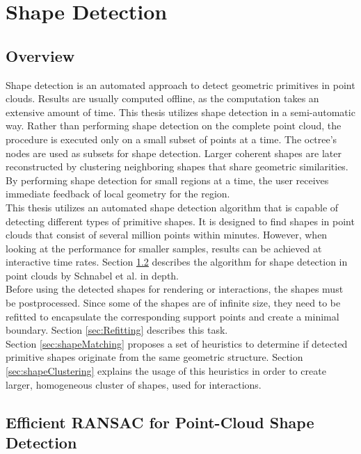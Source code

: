 \chapter{Shape Detection}
\label{chap:shapeDetection}


\section{Overview}

Shape detection is an automated approach to detect geometric primitives in point clouds. Results are usually computed offline, as the computation takes an extensive amount of time. This thesis utilizes shape detection in a semi-automatic way. Rather than performing shape detection on the complete point cloud, the procedure is executed only on a small subset of points at a time. The octree's nodes are used as subsets for shape detection. Larger coherent shapes are later reconstructed by clustering neighboring shapes that share geometric similarities. 
By performing shape detection for small regions at a time, the user receives immediate feedback of local geometry for the region. 
\\
This thesis utilizes an automated shape detection algorithm that is capable of detecting different types of primitive shapes. It is designed to find shapes in point clouds that consist of several million points within minutes. However, when looking at the performance for smaller samples, results can be achieved at interactive time rates. Section \ref{sec:schnabel} describes the algorithm for shape detection in point clouds by Schnabel et al. \cite{schnabel-2007-efficient} in depth. 
\\

Before using the detected shapes for rendering or interactions, the shapes must be postprocessed. Since some of the shapes are of infinite size, they need to be refitted to encapsulate the corresponding support points and create a minimal boundary. Section \ref{sec:Refitting} describes this task. 
\\

Section \ref{sec:shapeMatching} proposes a set of heuristics to determine if detected primitive shapes originate from the same geometric structure. Section \ref{sec:shapeClustering} explains the usage of this heuristics in order to create larger, homogeneous cluster of shapes, used for interactions. 


\section{Efficient RANSAC for Point-Cloud Shape Detection}
\label{sec:schnabel}

